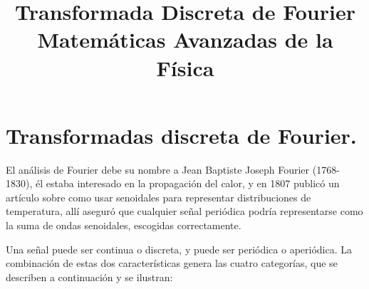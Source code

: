 
\title{Transformada Discreta de Fourier \\ {\large Matemáticas Avanzadas de la Física}}
\date{ }

\maketitle
\fontsize{14}{14}\selectfont
\section{Transformadas discreta de Fourier.}
El análisis de Fourier debe su nombre a Jean Baptiste Joseph Fourier (1768-1830), él estaba interesado en la
propagación del calor, y en 1807 publicó un artículo sobre como usar senoidales para representar distribuciones de temperatura, allí aseguró que cualquier señal periódica podría representarse como la suma de ondas senoidales, escogidas correctamente.
\par
Una señal puede ser continua o discreta, y puede ser periódica o aperiódica. La combinación de estas dos características genera las cuatro categorías, que se describen a continuación y se ilustran:
